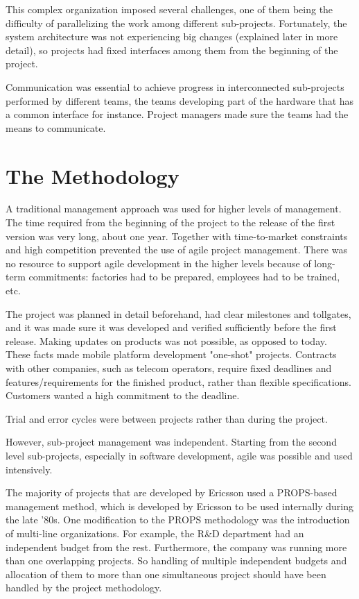 \documentclass[journal]{IEEEtran}
\begin{document}
This complex organization imposed several challenges, one of them being the difficulty of parallelizing the work among different sub-projects. Fortunately, the system architecture was not experiencing big changes (explained later in more detail), so projects had fixed interfaces among them from the beginning of the project.

Communication was essential to achieve progress in interconnected sub-projects performed by different teams, the teams developing part of the hardware that has a common interface for instance. Project managers made sure the teams had the means to communicate.  

\section{The Methodology}
A traditional management approach was used for higher levels of management. The time required from the beginning of the project to the release of the first version was very long, about one year. Together with time-to-market constraints and high competition prevented the use of agile project management. There was no resource to support agile development in the higher levels because of long-term commitments: factories had to be prepared, employees had to be trained, etc. 

The project was planned in detail beforehand, had clear milestones and tollgates, and it was made sure it was developed and verified sufficiently before the first release. Making updates on products was not possible, as opposed to today. These facts made mobile platform development "one-shot" projects. Contracts with other companies, such as telecom operators, require fixed deadlines and features/requirements for the finished product, rather than flexible specifications. Customers wanted a high commitment to the deadline.

Trial and error cycles were between projects rather than during the project.

However, sub-project management was independent. Starting from the second level sub-projects, especially in software development, agile was possible and used intensively.

The majority of projects that are developed by Ericsson used a PROPS-based management method, which is developed by Ericsson to be used internally during the late '80s. One modification to the PROPS methodology was the introduction of multi-line organizations. For example, the R\&D department had an independent budget from the rest. Furthermore, the company was running more than one overlapping projects. So handling of multiple independent budgets and allocation of them to more than one simultaneous project should have been handled by the project methodology. 
\end{document}
